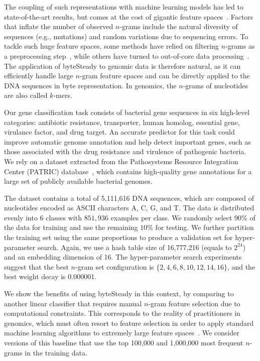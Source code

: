\documentclass[sigconf,review, anonymous]{acmart}
\begin{document}
The coupling of such representations with machine learning models has led to state-of-the-art results, but comes at the cost of gigantic feature spaces~\cite{drouin2019interpretable,vervier2016large}.
Factors that inflate the number of observed $n$-grams include the natural diversity of sequences (e.g., mutations) and random variations due to sequencing errors.
To tackle such huge feature spaces, some methods have relied on filtering $n$-grams as a preprocessing step~\cite{saeys2007review}, while others have turned to out-of-core data processing~\cite{drouin2016predictive,vervier2016large}.
The application of byteSteady to genomic data is therefore natural, as it can efficiently handle large $n$-gram feature spaces and can be directly applied to the DNA sequences in byte representation. In genomics, the \(n\)-grams of nucleotides are also called \(k\)-mers.

Our gene classification task consists of bacterial gene sequences in six high-level categories: antibiotic resistance, transporter, human homolog, essential gene, virulance factor, and drug target.
An accurate predictor for this task could improve automatic genome annotation and help detect important genes, such as those associated with the drug resistance and virulence of pathogenic bacteria.
We rely on a dataset extracted from the Pathosystems Resource Integration Center (PATRIC) database~\cite{davis2020patric,wattam2014patric}, which contains high-quality gene annotations for a large set of publicly available bacterial genomes.

The dataset contains a total of 5,111,616 DNA sequences, which are composed of nucleotides encoded as ASCII characters A, C, G, and T. The data is distributed evenly into $6$ classes with $851,936$ examples per class. We randomly select $90\%$ of the data for training and use the remaining $10\%$ for testing. We further partition the training set using the same proportions to produce a validation set for hyper-parameter search. Again, we use a hash table size of 16,777,216 (equals to \(2^{24}\)) and an embedding dimension of 16. The hyper-parameter search experiments suggest that the best \(n\)-gram set configuration is \(\{2,4,6,8,10,12,14,16\}\), and the best weight decay is 0.000001.

We show the benefits of using byteSteady in this context, by comparing to another linear classifier that requires manual $n$-gram feature selection due to computational constraints. This corresponds to the reality of practitioners in genomics, which must often resort to feature selection in order to apply standard machine learning algorithms to extremely large feature spaces~\cite{saeys2007review}.
We consider versions of this baseline that use the top 100,000 and 1,000,000 most frequent $n$-grams in the training data.
\end{document}
